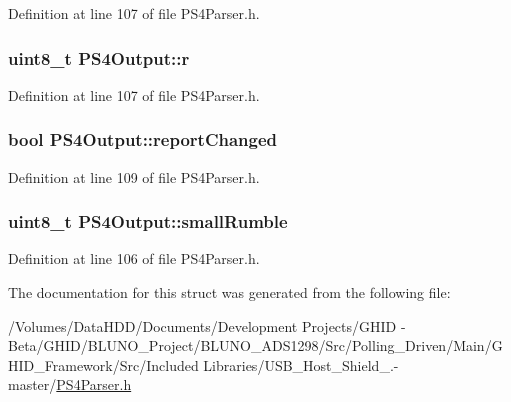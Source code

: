 \-Definition at line 107 of file \-P\-S4\-Parser.\-h.

\hypertarget{struct_p_s4_output_a76a85e749899e2e6cb135a6ec6acabb3}{
\subsubsection[{r}]{\setlength{\rightskip}{0pt plus 5cm}uint8\-\_\-t {\bf \-P\-S4\-Output\-::r}}}\label{struct_p_s4_output_a76a85e749899e2e6cb135a6ec6acabb3}


\-Definition at line 107 of file \-P\-S4\-Parser.\-h.

\hypertarget{struct_p_s4_output_aff395d1c46c9016ab4ea8ddbf034788b}{
\subsubsection[{report\-Changed}]{\setlength{\rightskip}{0pt plus 5cm}bool {\bf \-P\-S4\-Output\-::report\-Changed}}}\label{struct_p_s4_output_aff395d1c46c9016ab4ea8ddbf034788b}


\-Definition at line 109 of file \-P\-S4\-Parser.\-h.

\hypertarget{struct_p_s4_output_a8c6030198733f66a5cb96b8a49e07618}{
\subsubsection[{small\-Rumble}]{\setlength{\rightskip}{0pt plus 5cm}uint8\-\_\-t {\bf \-P\-S4\-Output\-::small\-Rumble}}}\label{struct_p_s4_output_a8c6030198733f66a5cb96b8a49e07618}


\-Definition at line 106 of file \-P\-S4\-Parser.\-h.



\-The documentation for this struct was generated from the following file\-:\begin{DoxyCompactItemize}
\item 
/\-Volumes/\-Data\-H\-D\-D/\-Documents/\-Development Projects/\-G\-H\-I\-D -\/ Beta/\-G\-H\-I\-D/\-B\-L\-U\-N\-O\-\_\-\-Project/\-B\-L\-U\-N\-O\-\_\-\-A\-D\-S1298/\-Src/\-Polling\-\_\-\-Driven/\-Main/\-G\-H\-I\-D\-\_\-\-Framework/\-Src/\-Included Libraries/\-U\-S\-B\-\_\-\-Host\-\_\-\-Shield\-\_.-\/master/\hyperlink{_p_s4_parser_8h}{\-P\-S4\-Parser.\-h}\end{DoxyCompactItemize}
